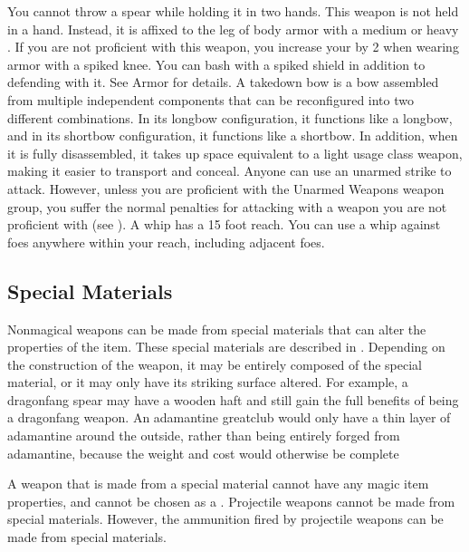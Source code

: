          You cannot throw a spear while holding it in two hands.
         This weapon is not held in a hand.
        Instead, it is affixed to the leg of body armor with a medium or heavy .
        If you are not proficient with this weapon, you increase your  by 2 when wearing armor with a spiked knee.
         You can bash with a spiked shield in addition to defending with it. See Armor for details.
         A takedown bow is a bow assembled from multiple independent components that can be reconfigured into two different combinations.
        In its longbow configuration, it functions like a longbow, and in its shortbow configuration, it functions like a shortbow.
        In addition, when it is fully disassembled, it takes up space equivalent to a light usage class weapon, making it easier to transport and conceal.
         Anyone can use an unarmed strike to attack.
        However, unless you are proficient with the Unarmed Weapons weapon group, you suffer the normal penalties for attacking with a weapon you are not proficient with (see ).
         A whip has a 15 foot reach.
        You can use a whip against foes anywhere within your reach, including adjacent foes.

    \subsection{Special Materials}\label{Special Materials}
        Nonmagical weapons can be made from special materials that can alter the properties of the item.
        These special materials are described in .
        Depending on the construction of the weapon, it may be entirely composed of the special material, or it may only have its striking surface altered.
        For example, a dragonfang spear may have a wooden haft and still gain the full benefits of being a dragonfang weapon.
        An adamantine greatclub would only have a thin layer of adamantine around the outside, rather than being entirely forged from adamantine, because the weight and cost would otherwise be complete

        A weapon that is made from a special material cannot have any magic item properties, and cannot be chosen as a .
        Projectile weapons cannot be made from special materials.
        However, the ammunition fired by projectile weapons can be made from special materials.

